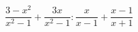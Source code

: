 \begin{ex}[type=expression]
	\begin{condition}
		\( \dfrac{3-x^2}{x^2-1}+\dfrac{3x}{x^2-1}:\dfrac{x}{x-1}+\dfrac{x-1}{x+1} \)
	\end{condition}
\end{ex}